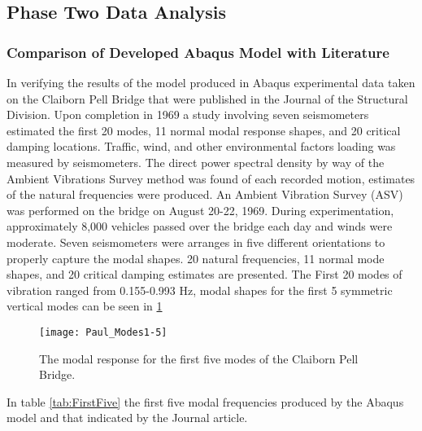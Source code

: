 \subsection{Phase Two Data Analysis}

\subsubsection{Comparison of Developed Abaqus Model with Literature}


In verifying the results of the model produced in Abaqus experimental data taken on the Claiborn Pell Bridge that were published in the Journal of the
Structural Division. Upon completion in 1969 a study involving seven seismometers estimated the first 20 modes, 11 normal modal response shapes, and 20
critical damping locations. Traffic, wind, and other environmental factors loading was measured by seismometers. The direct power spectral density by
way of the Ambient Vibrations Survey method was found of each recorded motion, estimates of the natural frequencies were produced. An Ambient Vibration
Survey (ASV) was performed on the bridge on August 20-22, 1969. During experimentation, approximately 8,000 vehicles passed over the bridge each day
and winds were moderate. Seven seismometers were arranges in five different orientations to properly capture the modal shapes. 20 natural
frequencies, 11 normal mode shapes, and 20 critical damping estimates are presented. The First 20 modes of vibration ranged from 0.155-0.993 Hz,
modal shapes for the first 5 symmetric vertical modes can be seen in \ref{fig:Paul_Modes1-5}\\

\begin{figure}

\centering

\texttt{[image: Paul\_Modes1-5]}

\caption{The modal response for the first five modes of the Claiborn Pell Bridge.}

\label{fig:Paul_Modes1-5}

\end{figure}

In table \ref{tab:FirstFive} the first five modal frequencies
produced by the Abaqus model and that indicated by the Journal
article.  


